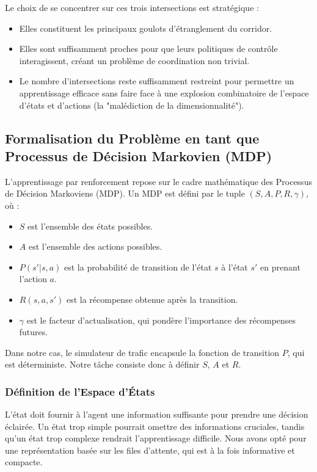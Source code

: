 Le choix de se concentrer sur ces trois intersections est stratégique :
\begin{itemize}
    \item Elles constituent les principaux goulots d'étranglement du corridor.
    \item Elles sont suffisamment proches pour que leurs politiques de contrôle interagissent, créant un problème de coordination non trivial.
    \item Le nombre d'intersections reste suffisamment restreint pour permettre un apprentissage efficace sans faire face à une explosion combinatoire de l'espace d'états et d'actions (la "malédiction de la dimensionnalité").
\end{itemize}

\subsection{Formalisation du Problème en tant que Processus de Décision Markovien (MDP)}
\label{sec:mdp_formalization}

L'apprentissage par renforcement repose sur le cadre mathématique des Processus de Décision Markoviens (MDP). Un MDP est défini par le tuple $(S, A, P, R, \gamma)$, où :
\begin{itemize}
    \item $S$ est l'ensemble des états possibles.
    \item $A$ est l'ensemble des actions possibles.
    \item $P(s'|s, a)$ est la probabilité de transition de l'état $s$ à l'état $s'$ en prenant l'action $a$.
    \item $R(s, a, s')$ est la récompense obtenue après la transition.
    \item $\gamma$ est le facteur d'actualisation, qui pondère l'importance des récompenses futures.
\end{itemize}

Dans notre cas, le simulateur de trafic encapsule la fonction de transition $P$, qui est déterministe. Notre tâche consiste donc à définir $S$, $A$ et $R$.

\subsubsection{Définition de l'Espace d'États}
\label{sec:state_space}

L'état doit fournir à l'agent une information suffisante pour prendre une décision éclairée. Un état trop simple pourrait omettre des informations cruciales, tandis qu'un état trop complexe rendrait l'apprentissage difficile. Nous avons opté pour une représentation basée sur les files d'attente, qui est à la fois informative et compacte.

